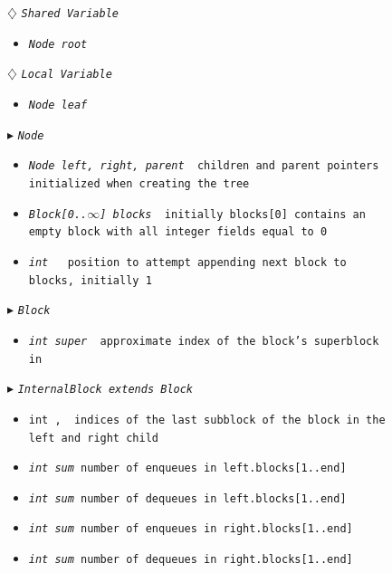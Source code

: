 \begin{figure}
\begin{algorithmic}[1]
\setcounter{ALG@line}{1}


\Statex $\diamondsuit$ \tt{\sl{Shared Variable}}
\begin{itemize}
\item \tt{\sl{Node} root} 
\end{itemize}

\Statex $\diamondsuit$ \tt{\sl{Local Variable}}
\begin{itemize}
\item \tt{\sl{Node} leaf} 
\end{itemize}

\Statex $\blacktriangleright$ \tt{\sl{Node}}
\begin{itemize}
\item \tt{\sl{Node} left, right, parent} \textsf{\com\ children and parent pointers initialized  when creating the tree}
\item \tt{\sl{Block[0..$\infty$]} blocks} \textsf{\com\ initially \tt{blocks[0]} contains an empty block with all integer fields equal to 0}
\item \tt{\sl{int} \head} \textsf{\com\ position to attempt appending next \tt{block} to \tt{blocks}, initially 1}
\end{itemize}

\Statex $\blacktriangleright$ \tt{\sl{Block}} 

\begin{itemize}
  \item \tt{\sl{int} super}
  \textsf{\com\ approximate index of the block's superblock in }
\end{itemize}



\Statex $\blacktriangleright$ \tt{\sl{InternalBlock} extends \sl{Block}} 
\begin{itemize}
    \item \tt{int} \eleft, \eright
  \textsf{\com\ indices of the last subblock of the block in the left and right child}
  \item \tt{\sl{int} sum}\textsf{\com\ number of enqueues in \tt{left.blocks[1..end]}}
  \item \tt{\sl{int} sum}\textsf{\com\ number of dequeues in \tt{left.blocks[1..end]}}
  \item \tt{\sl{int} sum}\textsf{\com\ number of enqueues in \tt{right.blocks[1..end]}}
  \item \tt{\sl{int} sum}\textsf{\com\ number of dequeues in \tt{right.blocks[1..end]}}
\end{itemize}


\end{algorithmic}
\end{figure}
